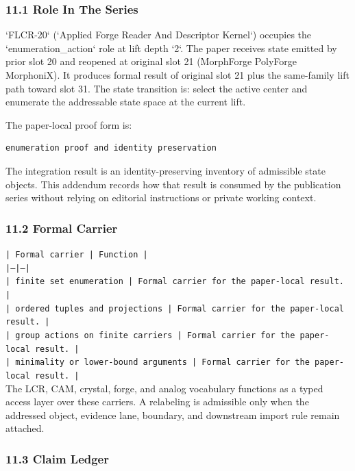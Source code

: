 \documentclass[11pt]{article}
\begin{document}
\subsubsection*{11.1 Role In The Series}

`FLCR-20` (`Applied Forge Reader And Descriptor Kernel`) occupies the `enumeration\_action` role at lift depth `2`.
The paper receives state emitted by prior slot 20 and reopened at original slot 21 (MorphForge PolyForge MorphoniX). It produces formal result of original slot 21 plus the same-family lift path toward slot 31. The state transition is:
select the active center and enumerate the addressable state space at the current lift.

The paper-local proof form is:

\begin{verbatim}
enumeration proof and identity preservation
\end{verbatim}

The integration result is an identity-preserving inventory of admissible state objects. This addendum records how that result is
consumed by the publication series without relying on editorial instructions or
private working context.

\subsubsection*{11.2 Formal Carrier}

\noindent\texttt{| Formal carrier | Function |}\\
\noindent\texttt{|---|---|}\\
\noindent\texttt{| finite set enumeration | Formal carrier for the paper-local result. |}\\
\noindent\texttt{| ordered tuples and projections | Formal carrier for the paper-local result. |}\\
\noindent\texttt{| group actions on finite carriers | Formal carrier for the paper-local result. |}\\
\noindent\texttt{| minimality or lower-bound arguments | Formal carrier for the paper-local result. |}\\

The LCR, CAM, crystal, forge, and analog vocabulary functions as a typed access
layer over these carriers. A relabeling is admissible only when the addressed
object, evidence lane, boundary, and downstream import rule remain attached.

\subsubsection*{11.3 Claim Ledger}
\end{document}
